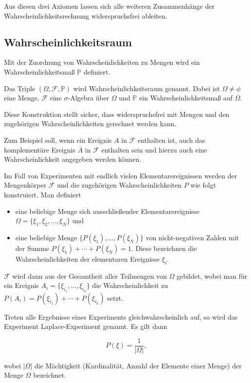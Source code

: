 Aus diesen drei Axiomen lassen sich alle weiteren Zusammenhänge der Wahrscheinlichkeitsrechnung widerspruchsfrei ableiten.

\subsection{Wahrscheinlichkeitsraum}
\label{sec:wahrscheinlichkeitsraum}

Mit der Zuordnung von Wahrscheinlichkeiten zu Mengen wird ein Wahrscheinlichkeitsmaß $\mathbb{P}$ definiert.

\begin{definition}[Wahrscheinlichkeitsraum]
Das Triple $(\Omega, \mathcal{F}, \mathbb{P})$ wird Wahrscheinlichkeitsraum genannt. Dabei ist $\Omega \neq \phi$ eine Menge, $\mathcal{F}$ eine $\sigma$-Algebra über $\Omega$ und $\mathbb{P}$ ein Wahrscheinlichkeitsmaß auf $\Omega$.
\end{definition}

Diese Konstruktion stellt sicher, dass widerspruchsfrei mit Mengen und den zugehörigen Wahrscheinlichkeiten gerechnet werden kann.

Zum Beispiel soll, wenn ein Ereignis $A$ in $\mathcal{F}$ enthalten ist, auch das komplementäre Ereignis $\overline{A}$ in $\mathcal{F}$ enthalten sein und hierzu auch eine Wahrscheinlichkeit angegeben werden können.

Im Fall von Experimenten mit endlich vielen Elementarereignissen werden der Mengenkörper $\mathcal{F}$ und die zugehörigen Wahrscheinlichkeiten $P$ wie folgt konstruiert. Man definiert

\begin{itemize}
  \item eine beliebige Menge sich ausschließender Elementarereignisse $\Omega = \{\xi_1, \xi_2, \ldots, \xi_N\}$ und
  \item eine beliebige Menge $\{P(\xi_1), \ldots, P(\xi_N)\}$ von nicht-negativen Zahlen mit der Summe $P(\xi_1) + \cdots + P(\xi_N) = 1$. Diese bezeichnen die Wahrscheinlichkeiten der elementaren Ereignisse $\xi_i$.
\end{itemize}

$\mathcal{F}$ wird dann aus der Gesamtheit aller Teilmengen von $\Omega$ gebildet, wobei man für ein Ereignis $A_i = \{\xi_{i_1}, \ldots, \xi_{i_k}\}$ die Wahrscheinlichkeit zu $P(A_i) = P(\xi_{i_1}) + \cdots + P(\xi_{i_k})$ setzt.

\begin{definition}
Treten alle Ergebnisse eines Experiments gleichwahrscheinlich auf, so wird das Experiment Laplace-Experiment genannt. Es gilt dann

$$
P(\xi) = \frac{1}{|\Omega|},
$$

wobei $|\Omega|$ die Mächtigkeit (Kardinalität, Anzahl der Elemente einer Menge) der Menge $\Omega$ bezeichnet.
\end{definition}

